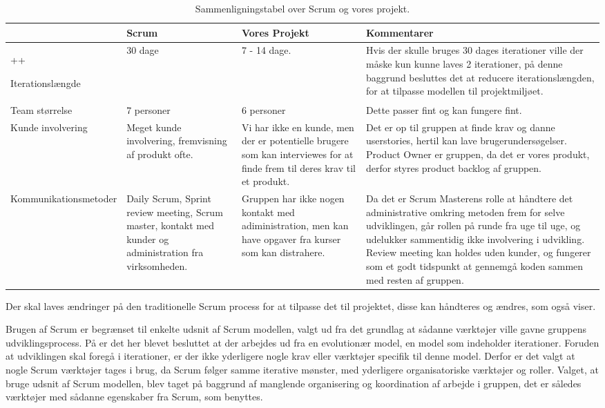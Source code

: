 \begin{sidewaystable}
      \begin{tabular}{p{5cm}p{5cm}p{5cm}p{5cm}}
	       				 & Scrum  & Vores Projekt & Kommentarer  \\ \hline++

	   Iterationslængde  		
	   		& 30 dage 
	   		& 7 - 14 dage. 
	   		& Hvis der skulle bruges 30 dages iterationer ville der måske kun kunne laves 2 iterationer, på denne baggrund besluttes det at reducere iterationslængden, for at tilpasse modellen til projektmiljøet.\\
	   		
	   Team størrelse    		
	   		& 7 personer
	   		& 6 personer 
	   		& Dette passer fint og kan fungere fint. \\
	   		
	   Kunde involvering 		
	   		& Meget kunde involvering, fremvisning af produkt ofte.
	   		& Vi har ikke en kunde, men der er potentielle brugere som kan interviewes for at finde frem til deres krav til et produkt.
	   		& Det er op til gruppen at finde krav og danne userstories, hertil kan lave brugerundersøgelser. Product Owner er gruppen, da det er vores produkt, derfor styres product backlog af gruppen.\\
	   		
	   Kommunikationsmetoder	
	   		& Daily Scrum, Sprint review meeting,  Scrum master, kontakt med kunder og administration fra virksomheden.
	   		& Gruppen har ikke nogen kontakt med adiministration, men kan have opgaver fra kurser som kan distrahere. 
	   		& Da det er Scrum Masterens rolle at håndtere det administrative omkring metoden frem for selve udviklingen, går rollen på runde fra uge til uge, og udelukker sammentidig ikke involvering i udvikling. Review meeting kan holdes uden kunder, og fungerer som et godt tidspunkt at gennemgå koden sammen med resten af gruppen. \\
    \end{tabular}
  \caption{Sammenligningstabel over Scrum og vores projekt.}\label{tabel:sammenligningstabel}
\end{sidewaystable}

Der skal laves ændringer på den traditionelle Scrum process  for at tilpasse det til projektet, disse kan håndteres og ændres, som  også viser.

Brugen af Scrum er begrænset til enkelte udsnit af Scrum modellen, valgt ud fra det grundlag at sådanne værktøjer ville gavne gruppens udviklingsprocess.
På  er det her blevet besluttet at der arbejdes ud fra en evolutionær model, en model som indeholder iterationer.
Foruden at udviklingen skal foregå i iterationer, er der ikke yderligere nogle krav eller værktøjer specifik til denne model.
Derfor er det valgt at nogle Scrum værktøjer tages i brug, da Scrum følger samme iterative mønster, med yderligere organisatoriske værktøjer og roller.
Valget, at bruge udsnit af Scrum modellen, blev taget på baggrund af manglende organisering og koordination af arbejde i gruppen, det er således værktøjer med sådanne egenskaber fra Scrum, som benyttes.

